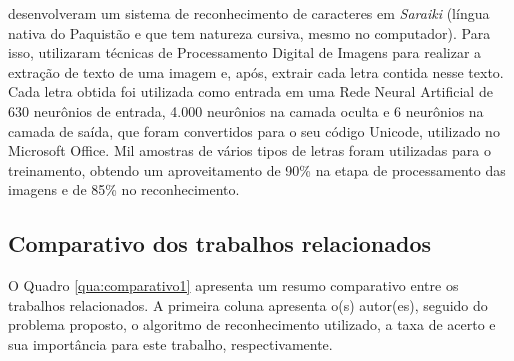 \documentclass[12pt,oneside,a4paper,chapter=TITLE,section=TITLE,sumario
		=tradicional]{abntex2}
\begin{document}
		 desenvolveram um sistema de reconhecimento de caracteres em \textit{Saraiki} (língua nativa do Paquistão e que tem natureza cursiva, mesmo no computador). Para isso, utilizaram técnicas de Processamento Digital de Imagens para realizar a extração de texto de uma imagem e, após, extrair cada letra contida nesse texto. Cada letra obtida foi utilizada como entrada em uma Rede Neural Artificial de 630 neurônios de entrada, 4.000 neurônios na camada oculta e 6 neurônios na camada de saída, que foram convertidos para o seu código Unicode, utilizado no Microsoft Office. Mil amostras de vários tipos de letras foram utilizadas para o treinamento, obtendo um aproveitamento de 90\% na etapa de processamento das imagens e de 85\% no reconhecimento.
		
		\subsection{Comparativo dos trabalhos relacionados}
		\label{sec:comp_trabalhosrelacionados}
		
		O Quadro \ref{qua:comparativo1} apresenta um resumo comparativo entre os trabalhos relacionados.
		A primeira coluna apresenta o(s) autor(es), seguido do problema proposto, o algoritmo de reconhecimento utilizado, a taxa de acerto e sua importância para este trabalho, respectivamente.
			
\end{document}
